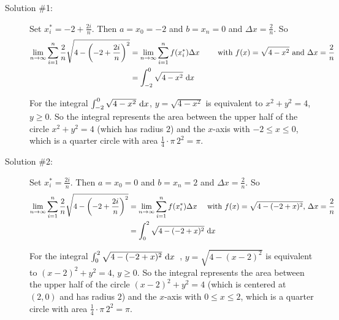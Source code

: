 \begin{solution}
\begin{description}
\item[Solution \#1:]
Set $x_i^*=-2+\frac{2i}{n}$. Then $a=x_0=-2$
and $b=x_n=0$ and $\Delta x=\frac{2}{n}$. So
\begin{align*}
\lim_{n\rightarrow\infty}
     \sum_{i=1}^n\frac{2}{n}\sqrt{4-\left(-2+\frac{2i}{n}\right)^2}
&= \lim_{n\rightarrow\infty}
     \sum_{i=1}^n f(x_i^*)\Delta x\qquad
   \text{ with $f(x) = \sqrt{4-x^2}$ and $\Delta x = \frac{2}{n}$ } \\
&=\int_{-2}^0 \sqrt{4-x^2}\,\,\mathrm{d}x
\end{align*}

For the integral $\int_{-2}^0 \sqrt{4-x^2}\,\,\mathrm{d}x$,
$y=\sqrt{4-x^2}$ is equivalent to $x^2+y^2=4$,
$y\ge 0$. So the integral represents the area between the upper
half of the circle $x^2+y^2=4$ (which has radius $2$)
and the $x$-axis with $-2\le x\le 0$, which is a quarter circle with area
$\frac{1}{4}\cdot \pi\, 2^2 = \pi$.

\begin{center}
\end{center}

\item[Solution \#2:]
Set $x_i^*=\frac{2i}{n}$. Then $a=x_0=0$
and $b=x_n=2$ and $\Delta x=\frac{2}{n}$. So
\begin{align*}
\lim_{n\rightarrow\infty}
     \sum_{i=1}^n\frac{2}{n}\sqrt{4-\left(-2+\frac{2i}{n}\right)^2}
&= \lim_{n\rightarrow\infty}
     \sum_{i=1}^n f(x_i^*)\Delta x\quad
   \text{ with $f(x) = \sqrt{4-(-2+x)^2}$, $\Delta x = \frac{2}{n}$ } \\
&=\int_0^2 \sqrt{4-(-2+x)^2}\,\,\mathrm{d}x
\end{align*}

For the integral $\int_{0}^2  \sqrt{4-(-2+x)^2}\,\,\mathrm{d}x$\ ,
$y=\sqrt{4-(x-2)^2}$ is equivalent to $(x-2)^2+y^2=4$,
$y\ge 0$. So the integral represents the area between the upper
half of the circle $(x-2)^2+y^2=4$ (which is centered at $(2,0)$ and has radius $2$)
and the $x$-axis with $0\le x\le 2$, which is a quarter circle with area
$\frac{1}{4}\cdot \pi\, 2^2 = \pi$.

\begin{center}
\end{center}

\end{description}

\end{solution}

